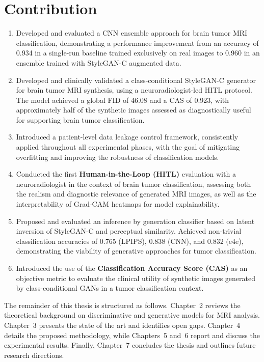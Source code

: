 \section{Contribution}
\begin{enumerate}



\item Developed and evaluated a CNN ensemble approach for brain tumor MRI classification, demonstrating a performance improvement from an accuracy of 0.934 in a single-run baseline trained exclusively on real images to 0.960 in an ensemble trained with StyleGAN-C augmented data.

\item Developed and clinically validated a class-conditional StyleGAN-C generator for brain tumor MRI synthesis, using a neuroradiologist-led HITL protocol. The model achieved a global FID of 46.08 and a CAS of 0.923, with approximately half of the synthetic images assessed as diagnostically useful for supporting brain tumor classification.


\item Introduced a patient-level data leakage control framework, consistently applied throughout all experimental phases, with the goal of mitigating overfitting and improving the robustness of classification models.



\item Conducted the first \textbf{Human-in-the-Loop (HITL)} evaluation with a neuroradiologist in the context of brain tumor classification, assessing both the realism and diagnostic relevance of generated MRI images, as well as the interpretability of Grad-CAM heatmaps for model explainability.



\item Proposed and evaluated an inference by generation classifier based on latent inversion of StyleGAN-C and perceptual similarity. Achieved non-trivial classification accuracies of 0.765 (LPIPS), 0.838 (CNN), and 0.832 (e4e), demonstrating the viability of generative approaches for tumor classification.

\item Introduced the use of the \textbf{Classification Accuracy Score (CAS)} as an objective metric to evaluate the clinical utility of synthetic images generated by class-conditional GANs in a tumor classification context.


\end{enumerate}


The remainder of this thesis is structured as follows. Chapter~2 reviews the theoretical background on discriminative and generative models for MRI analysis. Chapter~3 presents the state of the art and identifies open gaps. Chapter~4 details the proposed methodology, while Chapters~5 and~6 report and discuss the experimental results. Finally, Chapter~7 concludes the thesis and outlines future research directions.
